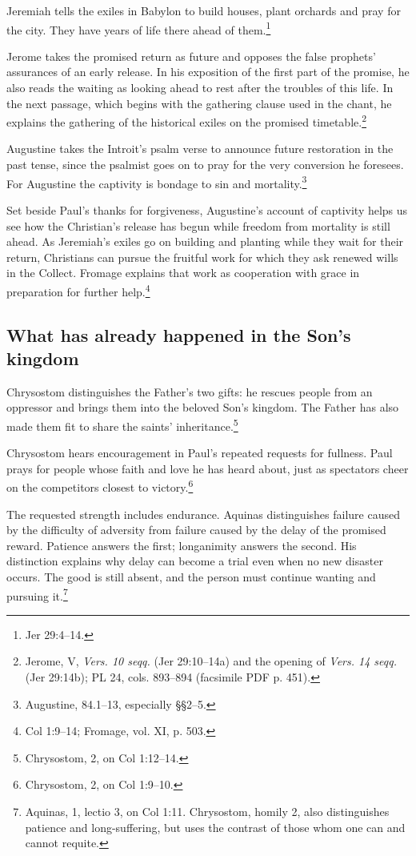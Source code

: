 Jeremiah tells the exiles in Babylon to build houses, plant orchards
and pray for the city. They have years of life there ahead of
them.\footnote{Jer 29:4--14.}

Jerome takes the promised return as future and opposes the false
prophets' assurances of an early release. In his exposition of the
first part of the promise, he also reads the waiting as looking ahead
to rest after the troubles of this life. In the next passage, which
begins with the gathering clause used in the chant, he explains the
gathering of the historical exiles on the promised
timetable.\footnote{Jerome,  V,
\textit{Vers. 10 seqq.} (Jer 29:10--14a) and the opening of
\textit{Vers. 14 seqq.} (Jer 29:14b); PL 24, cols. 893--894
(facsimile PDF p. 451).}

Augustine takes the Introit's psalm verse to announce future
restoration in the past tense, since the psalmist goes on to pray
for the very conversion he foresees. For Augustine the captivity
is bondage to sin and mortality.\footnote{Augustine,
 84.1--13,
especially §§2--5.}

Set beside Paul's thanks for forgiveness, Augustine's account of
captivity helps us see how the Christian's release has begun while
freedom from mortality is still ahead. As Jeremiah's exiles go on
building and planting while they wait for their return, Christians
can pursue the fruitful work for which they ask renewed wills in the
Collect. Fromage explains that work as cooperation with grace in
preparation for further help.\footnote{Col 1:9--14; Fromage,
vol. XI, p. 503.}

\subsection{What has already happened in the Son's kingdom}

Chrysostom distinguishes the Father's two gifts: he rescues people
from an oppressor and brings them into the beloved Son's kingdom.
The Father has also made them fit to share the saints'
inheritance.\footnote{Chrysostom, 
2, on Col 1:12--14.}

Chrysostom hears encouragement in Paul's repeated requests for
fullness. Paul prays for people whose faith and love he has heard
about, just as spectators cheer on the competitors closest to
victory.\footnote{Chrysostom,  2,
on Col 1:9--10.}

The requested strength includes endurance. Aquinas distinguishes
failure caused by the difficulty of adversity from failure caused
by the delay of the promised reward. Patience answers the first;
longanimity answers the second. His distinction explains why delay
can become a trial even when no new disaster occurs. The good is
still absent, and the person must continue wanting and pursuing
it.\footnote{Aquinas,  1, lectio 3,
on Col 1:11. Chrysostom, homily 2, also distinguishes patience
and long-suffering, but uses the contrast of those whom one can
and cannot requite.}


